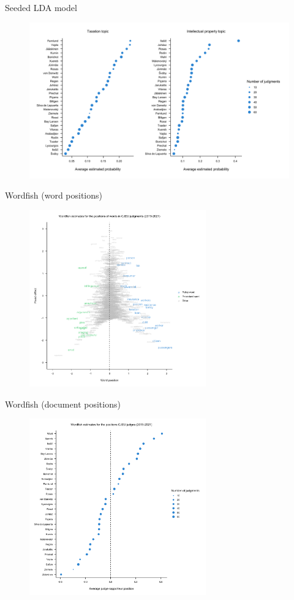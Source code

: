 \documentclass[pdf, 9pt, fleqn, handout]{beamer}
\begin{document}
\begin{frame}{Seeded LDA model}
\begin{figure}
\centering
\includegraphics[width = 4.5in]{judge_topics}
\end{figure}
\end{frame}

\begin{frame}{Wordfish (word positions)}
\begin{figure}
\centering
\includegraphics[width = 3in]{word_positions}
\end{figure}
\end{frame}

\begin{frame}{Wordfish (document positions)}
\begin{figure}
\centering
\includegraphics[width = 3in]{judge_positions}
\end{figure}
\end{frame}
\end{document}

